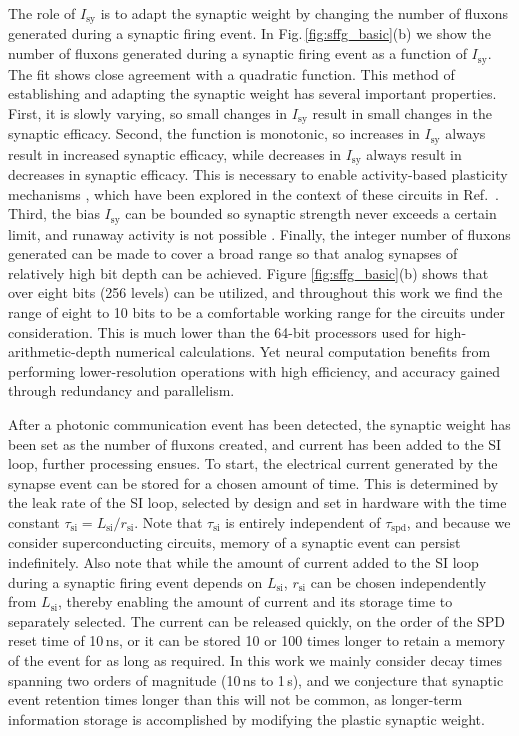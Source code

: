 \documentclass[twocolumn]{article}
\newcommand{\onlinecite}[1]{\hspace{-1 ex} \nocite{#1}\citenum{#1}}
\begin{document}
The role of $I_{\mathrm{sy}}$ is to adapt the synaptic weight by changing the number of fluxons generated during a synaptic firing event. In Fig.\,\ref{fig:sffg_basic}(b) we show the number of fluxons generated during a synaptic firing event as a function of $I_{\mathrm{sy}}$. The fit shows close agreement with a quadratic function. This method of establishing and adapting the synaptic weight has several important properties. First, it is slowly varying, so small changes in $I_{\mathrm{sy}}$ result in small changes in the synaptic efficacy. Second, the function is monotonic, so increases in $I_{\mathrm{sy}}$ always result in increased synaptic efficacy, while decreases in $I_{\mathrm{sy}}$ always result in decreases in synaptic efficacy. This is necessary to enable activity-based plasticity mechanisms \cite{somi2000,mage2012}, which have been explored in the context of these circuits in Ref.\,\onlinecite{sh2018_full}. Third, the bias $I_{\mathrm{sy}}$ can be bounded so synaptic strength never exceeds a certain limit, and runaway activity is not possible \cite{sh2018_full}. Finally, the integer number of fluxons generated can be made to cover a broad range so that analog synapses of relatively high bit depth can be achieved. Figure \ref{fig:sffg_basic}(b) shows that over eight bits (256 levels) can be utilized, and throughout this work we find the range of eight to 10 bits to be a comfortable working range for the circuits under consideration. This is much lower than the 64-bit processors used for high-arithmetic-depth numerical calculations. Yet neural computation benefits from performing lower-resolution operations with high efficiency, and accuracy gained through redundancy and parallelism. 

After a photonic communication event has been detected, the synaptic weight has been set as the number of fluxons created, and current has been added to the SI loop, further processing ensues. To start, the electrical current generated by the synapse event can be stored for a chosen amount of time. This is determined by the leak rate of the SI loop, selected by design and set in hardware with the time constant $\tau_{\mathrm{si}} = L_{\mathrm{si}}/r_{\mathrm{si}}$. Note that $\tau_{\mathrm{si}}$ is entirely independent of $\tau_{\mathrm{spd}}$, and because we consider superconducting circuits, memory of a synaptic event can persist indefinitely. Also note that while the amount of current added to the SI loop during a synaptic firing event depends on $L_{\mathrm{si}}$, $r_{\mathrm{si}}$ can be chosen independently from $L_{\mathrm{si}}$, thereby enabling the amount of current and its storage time to separately selected. The current can be released quickly, on the order of the SPD reset time of 10\,ns, or it can be stored 10 or 100 times longer to retain a memory of the event for as long as required. In this work we mainly consider decay times spanning two orders of magnitude (10\,ns to 1\,\textmu s), and we conjecture that synaptic event retention times longer than this will not be common, as longer-term information storage is accomplished by modifying the plastic synaptic weight. 
\end{document}
